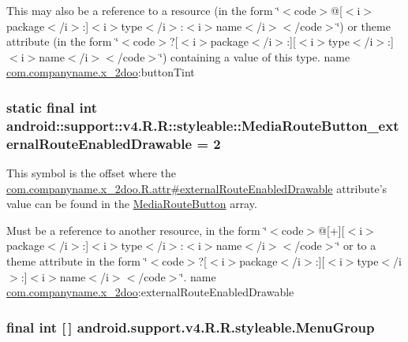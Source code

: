 This may also be a reference to a resource (in the form \char`\"{}$<$code$>$@\mbox{[}$<$i$>$package$<$/i$>$:\mbox{]}$<$i$>$type$<$/i$>$:$<$i$>$name$<$/i$>$$<$/code$>$\char`\"{}) or theme attribute (in the form \char`\"{}$<$code$>$?\mbox{[}$<$i$>$package$<$/i$>$:\mbox{]}\mbox{[}$<$i$>$type$<$/i$>$:\mbox{]}$<$i$>$name$<$/i$>$$<$/code$>$\char`\"{}) containing a value of this type.  name \hyperlink{namespacecom_1_1companyname_1_1x__2doo}{com.companyname.x\_\-2doo}:buttonTint \hypertarget{classandroid_1_1support_1_1v4_1_1_r_1_1styleable_8ae8e1423dabf0e93738248e95b25fd8}{
\subsubsection[{MediaRouteButton\_\-externalRouteEnabledDrawable}]{\setlength{\rightskip}{0pt plus 5cm}static final int android::support::v4.R.R::styleable::MediaRouteButton\_\-externalRouteEnabledDrawable = 2}}
\label{classandroid_1_1support_1_1v4_1_1_r_1_1styleable_8ae8e1423dabf0e93738248e95b25fd8}


This symbol is the offset where the \hyperlink{classcom_1_1companyname_1_1x__2doo_1_1_r_1_1attr_bc0fec80fdda096106acf7021ae96da7}{com.companyname.x\_\-2doo.R.attr\#externalRouteEnabledDrawable} attribute's value can be found in the \hyperlink{classandroid_1_1support_1_1v4_1_1_r_1_1styleable_b8373fc29d9d3ae7c46174f3caf39215}{MediaRouteButton} array.

Must be a reference to another resource, in the form \char`\"{}$<$code$>$@\mbox{[}+\mbox{]}\mbox{[}$<$i$>$package$<$/i$>$:\mbox{]}$<$i$>$type$<$/i$>$:$<$i$>$name$<$/i$>$$<$/code$>$\char`\"{} or to a theme attribute in the form \char`\"{}$<$code$>$?\mbox{[}$<$i$>$package$<$/i$>$:\mbox{]}\mbox{[}$<$i$>$type$<$/i$>$:\mbox{]}$<$i$>$name$<$/i$>$$<$/code$>$\char`\"{}.  name \hyperlink{namespacecom_1_1companyname_1_1x__2doo}{com.companyname.x\_\-2doo}:externalRouteEnabledDrawable \hypertarget{classandroid_1_1support_1_1v4_1_1_r_1_1styleable_ba730c6d04433f7e2cb2ad1dd3b251a3}{
\subsubsection[{MenuGroup}]{\setlength{\rightskip}{0pt plus 5cm}final int \mbox{[}$\,$\mbox{]} android.support.v4.R.R.styleable.MenuGroup}}
\label{classandroid_1_1support_1_1v4_1_1_r_1_1styleable_ba730c6d04433f7e2cb2ad1dd3b251a3}


